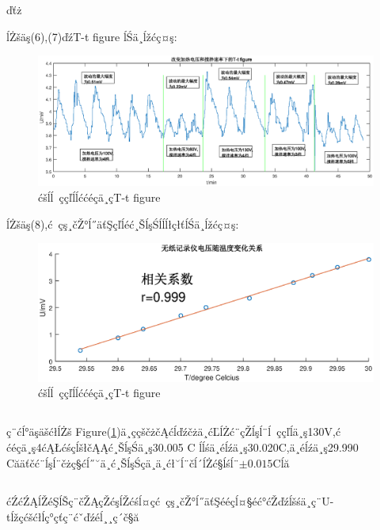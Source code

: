 ďťż\documentclass[10.5pt]{article}
\begin{document}
ĺŻšäş(6),(7)ďźT-t figure ĺŚä¸ĺžćç¤ş:
\begin{figure}[!ht]
\centering
\caption{ćšĺĺ ç­çľĺĺććéçä¸çT-t figure}
\includegraphics[width=400pt]{ConstTemperature/Figure5.eps}
\end{figure}


ĺŻšäş(8),ć çş¸čŽ°ĺ˝äťŞçľĺéć¸ŠĺşŚĺĺĺłçłťĺŚä¸ĺžćç¤ş:
\begin{figure}[!ht]
\centering
\caption{ćšĺĺ ç­çľĺĺććéçä¸çT-t figure \label{fig:UT}}
\includegraphics[width=400pt]{ConstTemperature/Figure6.eps}
\end{figure}
\newpage
\subsection{\textbf{}}

ç¨ćĺ°äşäšćłĺŻš Figure(\ref{fig:UT})ä¸­ççščżčĄćĺďźčżä¸ć­ĽĺŻć¨çŽĺşĺ¨ĺ ç­çľĺä¸ş130V,ććéçä¸ş4ćĄŁćśçĺšłčĄĄć¸ŠĺşŚä¸ş30.005 \degree C
ĺĺśä¸éĺźä¸ş30.020\degree C,ä¸éĺźä¸ş29.990 \degree Căäťčć¨ĺşĺ¨čżç§ćĺ˝˘ä¸ć¸ŠĺşŚçä¸ä¸ćł˘ĺ¨čĺ´ĺŻć§ĺśĺ¨$\pm0.015$\degree Cĺă
\subsection{\textbf{}}
ćŹćŹĄĺŽéŞĺŠç¨čŽĄçŽćşĺŽćśĺ¤çć çş¸čŽ°ĺ˝äťŞééçĺ¤§éć°ćŽďźĺšśä¸ç¨U-tĺžçćšćłĺç°çťç¨ćˇďźéĺ¸¸ç´č§ă
\end{document}
